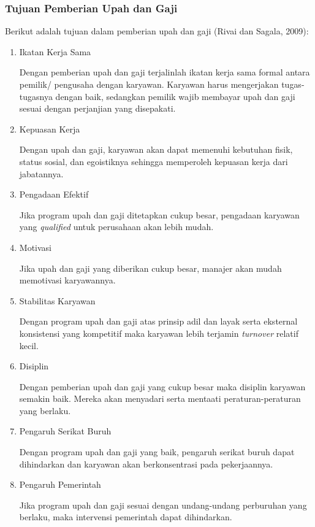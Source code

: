     \subsubsection{Tujuan Pemberian Upah dan Gaji}
    Berikut adalah tujuan dalam pemberian upah dan gaji (Rivai dan Sagala, 2009):
    \begin{enumerate}
        \itemsep0em
        \item Ikatan Kerja Sama
        
        Dengan pemberian upah dan gaji terjalinlah ikatan kerja sama formal antara pemilik/ pengusaha dengan karyawan. Karyawan harus mengerjakan tugas-tugasnya dengan baik, sedangkan pemilik wajib membayar upah dan gaji sesuai dengan perjanjian yang disepakati.
        \item Kepuasan Kerja
        
        Dengan upah dan gaji, karyawan akan dapat memenuhi kebutuhan fisik, status sosial, dan egoistiknya sehingga memperoleh kepuasan kerja dari jabatannya.
        \item Pengadaan Efektif
        
        Jika program upah dan gaji ditetapkan cukup besar, pengadaan karyawan yang \emph{qualified} untuk perusahaan akan lebih mudah.
        \item Motivasi
        
        Jika upah dan gaji yang diberikan cukup besar, manajer akan mudah memotivasi karyawannya.
        \item Stabilitas Karyawan
        
        Dengan program upah dan gaji atas prinsip adil dan layak serta eksternal konsistensi yang kompetitif maka karyawan lebih terjamin \emph{turnover} relatif kecil.
        \item Disiplin
        
        Dengan pemberian upah dan gaji yang cukup besar maka disiplin karyawan semakin baik. Mereka akan menyadari serta mentaati peraturan-peraturan yang berlaku.
        \item Pengaruh Serikat Buruh
        
        Dengan program upah dan gaji yang baik, pengaruh serikat buruh dapat dihindarkan dan karyawan akan berkonsentrasi pada pekerjaannya.
        \item Pengaruh Pemerintah
        
        Jika program upah dan gaji sesuai dengan undang-undang perburuhan yang berlaku, maka intervensi pemerintah dapat dihindarkan.
    \end{enumerate}

